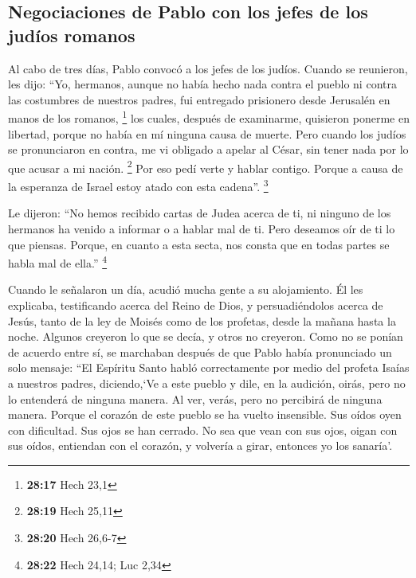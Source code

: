 \hypertarget{negociaciones-de-pablo-con-los-jefes-de-los-juduxedos-romanos}{%
\subsection{Negociaciones de Pablo con los jefes de los judíos
romanos}\label{negociaciones-de-pablo-con-los-jefes-de-los-juduxedos-romanos}}

 Al cabo de tres días, Pablo convocó a los jefes de los
judíos. Cuando se reunieron, les dijo: ``Yo, hermanos, aunque no había
hecho nada contra el pueblo ni contra las costumbres de nuestros padres,
fui entregado prisionero desde Jerusalén en manos de los romanos,
\footnote{\textbf{28:17} Hech 23,1}  los cuales, después
de examinarme, quisieron ponerme en libertad, porque no había en mí
ninguna causa de muerte.  Pero cuando los judíos se
pronunciaron en contra, me vi obligado a apelar al César, sin tener nada
por lo que acusar a mi nación. \footnote{\textbf{28:19} Hech 25,11}
 Por eso pedí verte y hablar contigo. Porque a causa de
la esperanza de Israel estoy atado con esta cadena''. \footnote{\textbf{28:20}
  Hech 26,6-7}

 Le dijeron: ``No hemos recibido cartas de Judea acerca
de ti, ni ninguno de los hermanos ha venido a informar o a hablar mal de
ti.  Pero deseamos oír de ti lo que piensas. Porque, en
cuanto a esta secta, nos consta que en todas partes se habla mal de
ella.'' \footnote{\textbf{28:22} Hech 24,14; Luc 2,34}

 Cuando le señalaron un día, acudió mucha gente a su
alojamiento. Él les explicaba, testificando acerca del Reino de Dios, y
persuadiéndolos acerca de Jesús, tanto de la ley de Moisés como de los
profetas, desde la mañana hasta la noche.  Algunos
creyeron lo que se decía, y otros no creyeron.  Como no
se ponían de acuerdo entre sí, se marchaban después de que Pablo había
pronunciado un solo mensaje: ``El Espíritu Santo habló correctamente por
medio del profeta Isaías a nuestros padres,  diciendo,`Ve
a este pueblo y dile, en la audición, oirás, pero no lo entenderá de
ninguna manera. Al ver, verás, pero no percibirá de ninguna manera.
 Porque el corazón de este pueblo se ha vuelto
insensible. Sus oídos oyen con dificultad. Sus ojos se han cerrado. No
sea que vean con sus ojos, oigan con sus oídos, entiendan con el
corazón, y volvería a girar, entonces yo los sanaría'.

